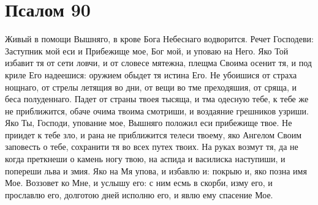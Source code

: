 \section{Псалом 90}\begin{mymulticols}



Живый в помощи Вышняго, в крове Бога Небеснаго водворится. Речет Господеви: Заступник мой еси и Прибежище мое, Бог мой, и уповаю на Него. Яко Той избавит тя от сети ловчи, и от словесе мятежна, плещма Своима осенит тя, и под криле Его надеешися: оружием обыдет тя истина Его. Не убоишися от страха нощнаго, от стрелы летящия во дни, от вещи во тме преходяшия, от сряща, и беса полуденнаго. Падет от страны твоея тысяща, и тма одесную тебе, к тебе же не приближится, обаче очима твоима смотриши, и воздаяние грешников узриши. Яко Ты, Господи, упование мое, Вышняго положил еси прибежище твое. Не приидет к тебе зло, и рана не приближится телеси твоему, яко Ангелом Своим заповесть о тебе, сохранити тя во всех путех твоих. На руках возмут тя, да не когда преткнеши о камень ногу твою, на аспида и василиска наступиши, и попереши льва и змия. Яко на Мя упова, и избавлю и: покрыю и, яко позна имя Мое. Воззовет ко Мне, и услышу его: с ним есмь в скорби, изму его, и прославлю его, долготою дней исполню его, и явлю ему спасение Мое.


\end{mymulticols}

